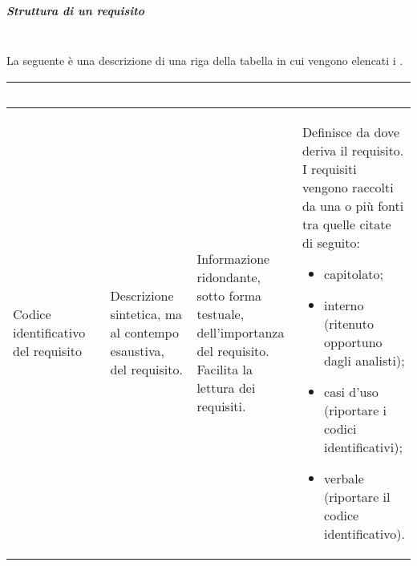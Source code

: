 \subparagraph*{Struttura di un requisito}\mbox{}\\
La seguente è una descrizione di una riga della tabella in cui vengono elencati i .

{
\renewcommand{\arraystretch}{1.5}
\centering
\begin{longtable}{C{3cm} C{3.2cm} C{4.3cm} C{4.3cm}}
\textcolor{white}{\textbf{Identificativo}} & %
\textcolor{white}{\textbf{Descrizione}} & %
\textcolor{white}{\textbf{Classificazione}} & %
\textcolor{white}{\textbf{Fonti}}\\ %
\endhead
Codice identificativo del requisito & %
Descrizione sintetica, ma al contempo esaustiva, del requisito. & %
Informazione ridondante, sotto forma testuale, dell’importanza del requisito. Facilita la lettura dei requisiti. & %
Definisce da dove deriva il requisito. I requisiti vengono raccolti da una o più fonti tra quelle citate di seguito:
\begin{itemize}
	\item capitolato;
	\item interno (ritenuto opportuno dagli analisti);
	\item casi d'uso (riportare i codici identificativi);
	\item verbale (riportare il codice identificativo).
\end{itemize} \\
\end{longtable}
}